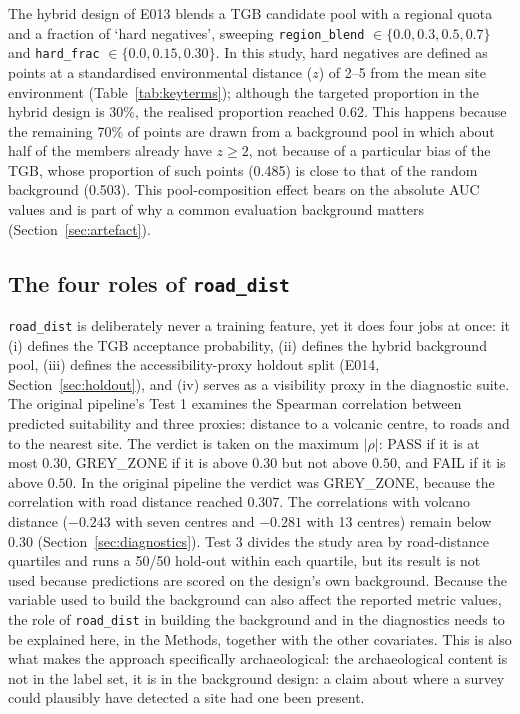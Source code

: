 \documentclass[12pt]{article}
\begin{document}
The hybrid design of E013 blends a TGB candidate pool with a regional quota and a fraction of `hard negatives', sweeping \texttt{region\_blend} $\in \{0.0,0.3,0.5,0.7\}$ and \texttt{hard\_frac} $\in \{0.0,0.15,0.30\}$.
In this study, hard negatives are defined as points at a standardised environmental distance ($z$) of 2--5 from the mean site environment (Table~\ref{tab:keyterms}); although the targeted proportion in the hybrid design is 30\%, the realised proportion reached 0.62.
This happens because the remaining 70\% of points are drawn from a background pool in which about half of the members already have $z \geq 2$, not because of a particular bias of the TGB, whose proportion of such points (0.485) is close to that of the random background (0.503).
This pool-composition effect bears on the absolute AUC values and is part of why a common evaluation background matters (Section~\ref{sec:artefact}).

\subsection{The four roles of \texttt{road\_dist}}
\label{sec:fourroles}

\texttt{road\_dist} is deliberately never a training feature, yet it does four jobs at once: it (i) defines the TGB acceptance probability, (ii) defines the hybrid background pool, (iii) defines the accessibility-proxy holdout split (E014, Section~\ref{sec:holdout}), and (iv) serves as a visibility proxy in the diagnostic suite.
The original pipeline's Test 1 examines the Spearman correlation between predicted suitability and three proxies: distance to a volcanic centre, to roads and to the nearest site. The verdict is taken on the maximum $|\rho|$: PASS if it is at most $0.30$, GREY\_ZONE if it is above $0.30$ but not above $0.50$, and FAIL if it is above $0.50$. In the original pipeline the verdict was GREY\_ZONE, because the correlation with road distance reached $0.307$. The correlations with volcano distance ($-0.243$ with seven centres and $-0.281$ with 13 centres) remain below $0.30$ (Section~\ref{sec:diagnostics}). Test 3 divides the study area by road-distance quartiles and runs a 50/50 hold-out within each quartile, but its result is not used because predictions are scored on the design's own background.
Because the variable used to build the background can also affect the reported metric values, the role of \texttt{road\_dist} in building the background and in the diagnostics needs to be explained here, in the Methods, together with the other covariates.
This is also what makes the approach specifically archaeological: the archaeological content is not in the label set, it is in the background design: a claim about where a survey could plausibly have detected a site had one been present.
\end{document}
